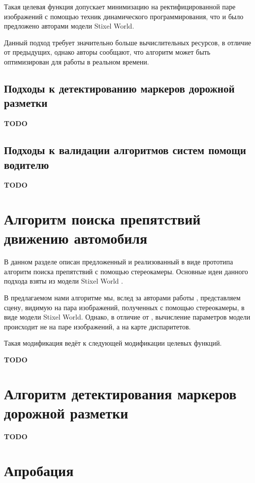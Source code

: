 \documentclass[aps,%
14pt,%
final,%
oneside,
onecolumn,%
musixtex, %
superscriptaddress,%
centertags]{extarticle} %
\begin{document}
Такая целевая функция допускает минимизацию на ректифицированной паре изображений с помощью техник динамического программирования, что и было предложено авторами модели Stixel World.

Данный подход требует значительно больше вычислительных ресурсов, в отличие от предыдущих, однако авторы \cite{benenson2011stixels} сообщают, что алгоритм может быть оптимизирован для работы в реальном времени.


\subsection{Подходы к детектированию маркеров дорожной разметки}

\textbf{\Large \color{Red} TODO}

\subsection{Подходы к валидации алгоритмов систем помощи водителю}

\textbf{\Large \color{Red} TODO}

\section{Алгоритм поиска препятствий движению автомобиля}

В данном разделе описан предложенный и реализованный в виде прототипа алгоритм поиска препятствий с помощью стереокамеры. Основные идеи данного подхода взяты из модели Stixel World \cite{pfeiffer2010efficient}.

В предлагаемом нами алгоритме мы, вслед за авторами работы \cite{pfeiffer2010efficient}, представляем сцену, видимую на пара изображений, полученных с помощью стереокамеры, в виде модели Stixel World. Однако, в отличие от \cite{pfeiffer2010efficient}, вычисление параметров модели происходит не на паре изображений, а на карте диспаритетов.

Такая модификация ведёт к следующей модификации целевых функций. 

\textbf{\Large \color{Red} TODO}

\section{Алгоритм детектирования маркеров дорожной разметки}

\textbf{\Large \color{Red} TODO}

\section{Апробация}
\end{document}
